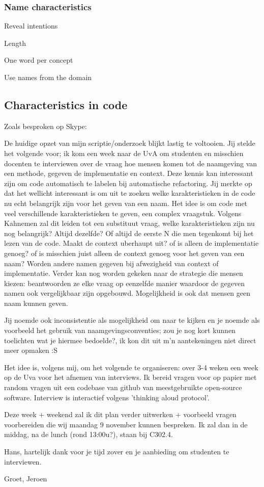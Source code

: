 \subsubsection{Name characteristics}
\label{sec:name-characteristics}

\begin{list}{-}{Characteristics of names in programming:}
\item Reveal intentions
\item Length
\item One word per concept
\item Use names from the domain
\end{list}


\subsection{Characteristics in code}




Zoals besproken op Skype:

De huidige opzet van mijn scriptie/onderzoek blijkt lastig te voltooien. Jij stelde het volgende voor; ik kom een week naar de UvA om studenten en misschien docenten te interviewen over de vraag hoe mensen komen tot de naamgeving van een methode, gegeven de implementatie en context. Deze kennis kan interessant zijn om code automatisch te labelen bij automatische refactoring. Jij merkte op dat het wellicht interessant is om uit te zoeken welke karakteristieken in de code nu echt belangrijk zijn voor het geven van een naam. Het idee is om code met veel verschillende karakteristieken te geven, een complex vraagstuk. Volgens Kahnemen zal dit leiden tot een substituut vraag, welke karakteristieken zijn nu nog belangrijk? Altijd dezelfde? Of altijd de eerste N die men tegenkomt bij het lezen van de code. Maakt de context uberhaupt uit? of is alleen de implementatie genoeg? of is misschien juist alleen de context genoeg voor het geven van een naam? Worden andere namen gegeven bij afwezigheid van context of implementatie. Verder kan nog worden gekeken naar de strategie die mensen kiezen: beantwoorden ze elke vraag op eenzelfde manier waardoor de gegeven namen ook vergelijkbaar zijn opgebouwd. Mogelijkheid is ook dat mensen geen naam kunnen geven. 

Jij noemde ook inconsistentie als mogelijkheid om naar te kijken en je noemde als voorbeeld het gebruik van naamgevingsconventies; zou je nog kort kunnen toelichten wat je hiermee bedoelde?, ik kon dit uit m'n aantekeningen niet direct meer opmaken :S

Het idee is, volgens mij, om het volgende te organiseren: over 3-4 weken een week op de Uva voor het afnemen van interviews. Ik bereid vragen voor op papier met random vragen uit een codebase van github van meestgebruikte open-source software. Interview is interactief volgens 'thinking aloud protocol'.

Deze week + weekend zal ik dit plan verder uitwerken + voorbeeld vragen voorbereiden die wij maandag 9 november kunnen bespreken. Ik zal dan in de middag, na de lunch (rond 13:00u?), staan bij C302.4.

Hans, hartelijk dank voor je tijd zover en je aanbieding om studenten te interviewen.

Groet,
Jeroen